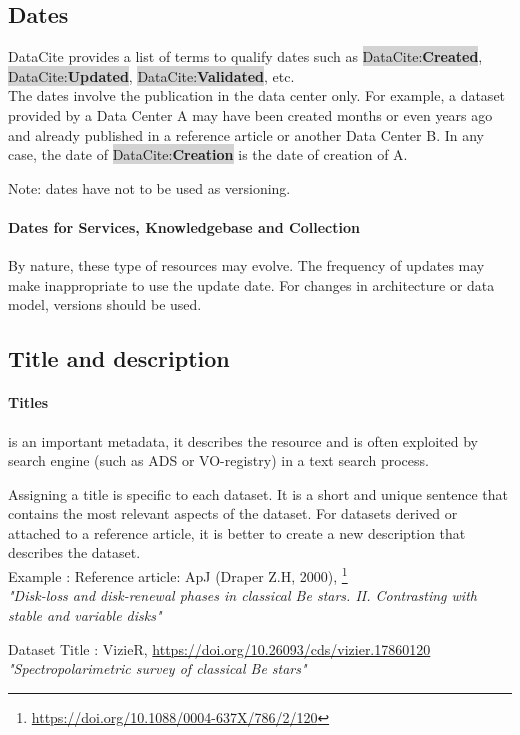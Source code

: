\documentclass[11pt,a4paper]{ivoa}
\newcommand{\dataciteterm}[1]{\colorbox{lightgray}{DataCite:\textbf{#1}}}
\begin{document}
\subsection{Dates}
\label{sec:dates}
DataCite provides a list of terms to qualify dates such as \dataciteterm{Created}, \dataciteterm{Updated}, \dataciteterm{Validated}, etc.\\

The dates involve the publication in the data center only.
For example, a dataset provided by a Data Center A may have been created months or even years ago and already published in a reference article or another Data Center B. In any case, the date of \dataciteterm{Creation} is the date of creation of A.

Note: dates have not to be used as versioning.

\paragraph{Dates for Services, Knowledgebase and Collection}
By nature, these type of resources may evolve. The frequency of updates may make inappropriate to use the update date. For changes in architecture or data model, versions should be used.


\subsection{Title and description}
\label{sec:title}
\paragraph{Titles} is an important metadata, it describes the resource and is often exploited by search engine (such as ADS or VO-registry) in a text search process.


Assigning a title is specific to each dataset. 
It is a short and unique sentence that contains the most relevant aspects of the dataset.
For datasets derived or attached to a reference article, it is better to create a new description that describes the dataset.\\


Example : Reference article: ApJ (Draper Z.H, 2000), \footnote{\url{https://doi.org/10.1088/0004-637X/786/2/120}}\\
\textit{"Disk-loss and disk-renewal phases in classical Be stars. II. Contrasting with stable and variable disks"}


Dataset Title : VizieR, \url{https://doi.org/10.26093/cds/vizier.17860120} \\
\textit{"Spectropolarimetric survey of classical Be stars"}\\
\end{document}
